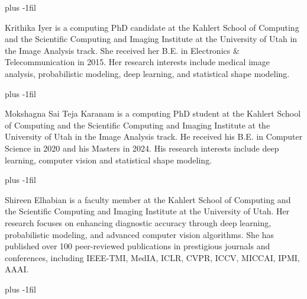 \baselineskip plus -1fil
\begin{IEEEbiographynophoto}{Krithika Iyer} is a computing PhD candidate at the Kahlert School of Computing and 
the Scientific Computing and Imaging Institute at the University of Utah in the Image Analysis track. She received her B.E. in Electronics \& Telecommunication in 2015. Her research interests include medical image analysis, probabilistic modeling, deep learning, and statistical shape modeling.\end{IEEEbiographynophoto}
\baselineskip plus -1fil
\begin{IEEEbiographynophoto}{Mokshagna Sai Teja Karanam} is a computing PhD student at the Kahlert School of Computing and the Scientific Computing and Imaging Institute at the University of Utah in the Image Analysis track. He received his B.E. in Computer Science in 2020 and his Masters in 2024. His research interests include deep learning, computer vision and statistical shape modeling.\end{IEEEbiographynophoto}
\baselineskip plus -1fil
\begin{IEEEbiographynophoto}{Shireen Elhabian} is a faculty member at the Kahlert School of Computing and the Scientific Computing and Imaging Institute at the University of Utah. Her research focuses on enhancing diagnostic accuracy through deep learning, probabilistic modeling, and advanced computer vision algorithms. She has published over 100 peer-reviewed publications in prestigious journals and conferences, including IEEE-TMI, MedIA, ICLR, CVPR, ICCV, MICCAI, IPMI, AAAI. \end{IEEEbiographynophoto}
\baselineskip plus -1fil